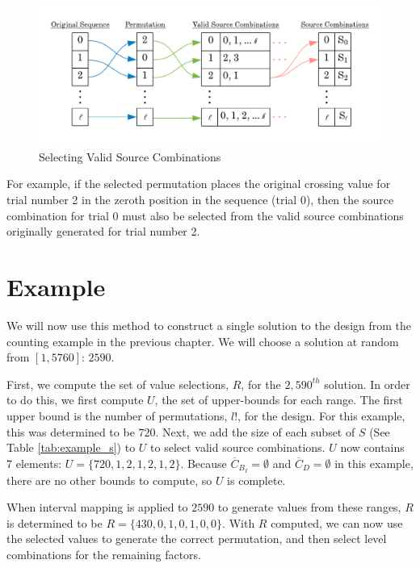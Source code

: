 \begin{figure}[htb]
\centering
\centerline{\includegraphics[origin=c,width=12cm]{../figures/source-combination-mapping.png}}
\caption{Selecting Valid Source Combinations}
\label{fig:source_combinations}
\end{figure}

For example, if the selected permutation places the original crossing value for trial number 2 in the zeroth position in the sequence (trial 0), then the source combination for trial 0 must also be selected from the valid source combinations originally generated for trial number 2.


\section{Example}

We will now use this method to construct a single solution to the design from the counting example in the previous chapter. We will choose a solution at random from $[1, 5760]$: $2590$.

First, we compute the set of value selections, $R$, for the $2,590^{th}$ solution. In order to do this, we first compute $U$, the set of upper-bounds for each range. The first upper bound is the number of permutations, $l!$, for the design. For this example, this was determined to be $720$. Next, we add the size of each subset of $S$ (See Table \ref{tab:example_s}) to $U$ to select valid source combinations. $U$ now contains 7 elements: $U = \{720, 1, 2, 1, 2, 1, 2\}$. Because $\overline{C}_{B_I} = \emptyset$ and $\overline{C}_D = \emptyset$ in this example, there are no other bounds to compute, so $U$ is complete.

When interval mapping is applied to $2590$ to generate values from these ranges, $R$ is determined to be $R = \{430, 0, 1, 0, 1, 0, 0\}$. With $R$ computed, we can now use the selected values to generate the correct permutation, and then select level combinations for the remaining factors.

